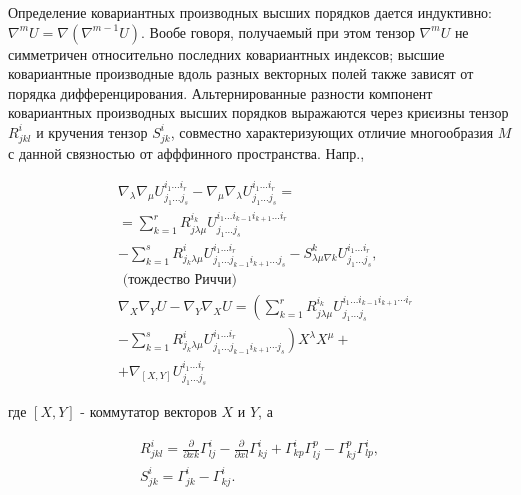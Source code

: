 \documentclass[10pt]{article}
\begin{document}
Определение ковариантных производных высших порядков дается индуктивно: $\nabla^{m} U=\nabla\left(\nabla^{m-1} U\right)$. Вообе говоря, получаемый при этом тензор $\nabla^{m} U$ не симметричен относительно последних ковариантных индексов; высшие ковариантные производные вдоль разных векторных полей также зависят от порядка дифференцирования. Альтернированные разности компонент ковариантных производных высших порядков выражаются через криєизны тензор $R_{j k l}^{i}$ и кручения тензор $S_{j k}^{i}$, совместно характеризующих отличие многообразия $M$ с данной связностью от афффинного пространства. Напр.,



\[

\begin{aligned}

& \nabla_{\lambda} \nabla_{\mu} U_{j_{1} \ldots j_{s}}^{i_{1} \ldots i_{r}}-\nabla_{\mu} \nabla_{\lambda} U_{j_{1} \ldots j_{s}}^{i_{1} \ldots i_{r}}= \\

& =\sum_{k=1}^{r} R_{j \lambda \mu}^{i_{k}} U_{j_{1} \ldots j_{s}}^{i_{1} \ldots i_{k-1} i_{k+1} \ldots i_{r}} \\

& -\sum_{k=1}^{s} R_{j_{k} \lambda \mu}^{i} U_{j_{1} \ldots j_{k-1} i_{k+1} \ldots j_{s}}^{i_{1} \ldots i_{r}}-S_{\lambda \mu \nabla k}^{k} U_{j_{1} \ldots j_{s}}^{i_{1} \ldots i_{r}} \text {, } \\

& \text { (тождество Риччи) } \\

& \nabla_{X} \nabla_{Y} U-\nabla_{Y} \nabla_{X} U=\left(\sum_{k=1}^{r} R_{j \lambda \mu}^{i_{k}} U_{j_{1} \ldots j_{s}}^{i_{1} \ldots i_{k-1} i_{k+1} \cdots i_{r}}\right. \\

& \left.-\sum_{k=1}^{s} R_{j_{k} \lambda \mu}^{i} U_{j_{1} \ldots j_{k-1} i_{k+1} \cdots j_{s}}^{i_{1} \ldots i_{r}}\right) X^{\lambda} X^{\mu}+ \\

& +\nabla_{[X, Y]} U_{j_{1} \ldots j_{s}}^{i_{1} \ldots i_{r}}

\end{aligned}

\]



где $[X, Y]$ - коммутатор векторов $X$ и $Y$, а



\[

\begin{gathered}

R_{j k l}^{i}=\frac{\partial}{\partial x k} \Gamma_{l j}^{i}-\frac{\partial}{\partial x l} \Gamma_{k j}^{i}+\Gamma_{k p}^{i} \Gamma_{l j}^{p}-\Gamma_{k j}^{p} \Gamma_{l p}^{i}, \\

S_{j k}^{i}=\Gamma_{j k}^{i}-\Gamma_{k j}^{i} .

\end{gathered}

\]
\end{document}
